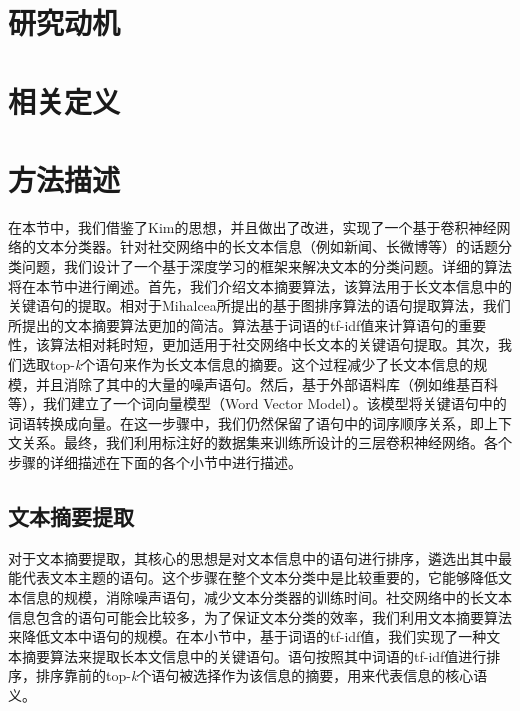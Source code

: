 \section{研究动机}
\label{sec3:motivation}

\section{相关定义}
\label{sec3:definition}

\section{方法描述}
\label{sec3:method}
在本节中，我们借鉴了Kim的思想，并且做出了改进，实现了一个基于卷积神经网络的文本分类器。针对社交网络中的长文本信息（例如新闻、长微博等）的话题分类问题，我们设计了一个基于深度学习的框架来解决文本的分类问题。详细的算法将在本节中进行阐述。首先，我们介绍文本摘要算法，该算法用于长文本信息中的关键语句的提取。相对于Mihalcea所提出的基于图排序算法的语句提取算法，我们所提出的文本摘要算法更加的简洁。算法基于词语的tf-idf值来计算语句的重要性，该算法相对耗时短，更加适用于社交网络中长文本的关键语句提取。其次，我们选取top-\textit{k}个语句来作为长文本信息的摘要。这个过程减少了长文本信息的规模，并且消除了其中的大量的噪声语句。然后，基于外部语料库（例如维基百科等），我们建立了一个词向量模型（Word Vector Model）。该模型将关键语句中的词语转换成向量。在这一步骤中，我们仍然保留了语句中的词序顺序关系，即上下文关系。最终，我们利用标注好的数据集来训练所设计的三层卷积神经网络。各个步骤的详细描述在下面的各个小节中进行描述。

\subsection{文本摘要提取}
\label{subsec3:abstactExtract}
对于文本摘要提取，其核心的思想是对文本信息中的语句进行排序，遴选出其中最能代表文本主题的语句。这个步骤在整个文本分类中是比较重要的，它能够降低文本信息的规模，消除噪声语句，减少文本分类器的训练时间。社交网络中的长文本信息包含的语句可能会比较多，为了保证文本分类的效率，我们利用文本摘要算法来降低文本中语句的规模。在本小节中，基于词语的tf-idf值，我们实现了一种文本摘要算法来提取长本文信息中的关键语句。语句按照其中词语的tf-idf值进行排序，排序靠前的top-\textit{k}个语句被选择作为该信息的摘要，用来代表信息的核心语义。

